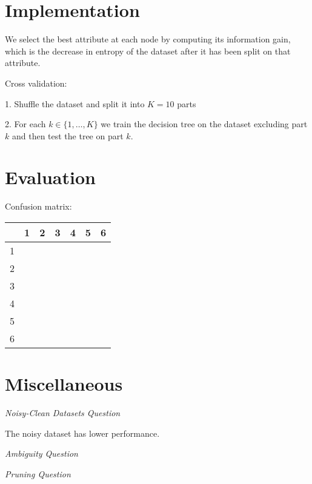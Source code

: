 \documentclass[12pt, a4paper, portrait]{article}
\begin{document}
\section*{Implementation}
We select the best attribute at each node by computing its information gain, which is the decrease in entropy of the dataset after it has been split on that attribute.\par
\bigskip
Cross validation:\par
1. Shuffle the dataset and split it into $K = 10$ parts\par
2. For each $k \in \{1, \dots, K\}$ we train the decision tree on the dataset excluding part $k$ and then test the tree on part $k$.

\section*{Evaluation}
Confusion matrix:
\begin{center}
\begin{tabular} { C{0.7cm} | C{1cm} C{1cm} C{1cm} C{1cm} C{1cm} C{1cm} }
    & 1 & 2 & 3 & 4 & 5 & 6 \\  &   &   &   &   &   &   \\
    2 &   &   &   &   &   &   \\
    3 &   &   &   &   &   &   \\
    4 &   &   &   &   &   &   \\
    5 &   &   &   &   &   &   \\
    6 &   &   &   &   &   &
\end{tabular}
\end{center}

\section*{Miscellaneous}

\textit{Noisy-Clean Datasets Question}\par
\bigskip
The noisy dataset has lower performance.\par
\bigskip

\textit{Ambiguity Question}\par
\bigskip

\textit{Pruning Question}\par
\bigskip
\end{document}
